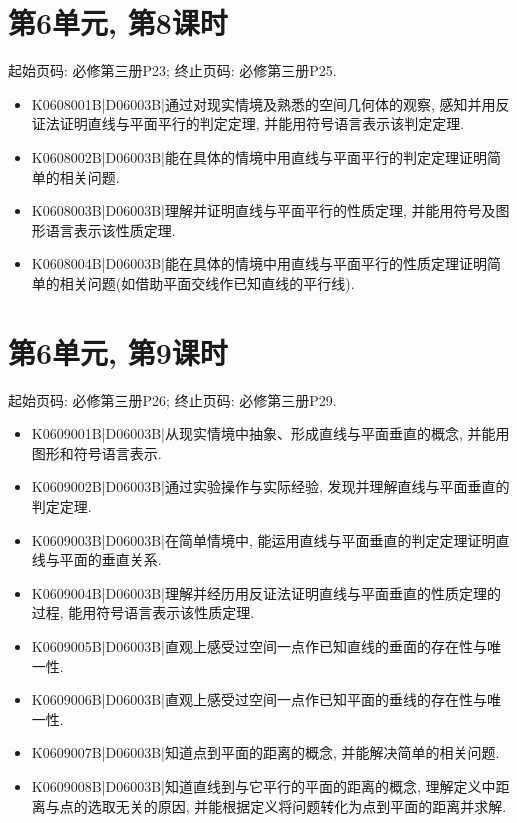 \section*{第6单元, 第8课时}
起始页码: 必修第三册P23; 终止页码: 必修第三册P25.
\begin{itemize}
\item K0608001B|D06003B|通过对现实情境及熟悉的空间几何体的观察, 感知并用反证法证明直线与平面平行的判定定理, 并能用符号语言表示该判定定理.
\item K0608002B|D06003B|能在具体的情境中用直线与平面平行的判定定理证明简单的相关问题.
\item K0608003B|D06003B|理解并证明直线与平面平行的性质定理, 并能用符号及图形语言表示该性质定理.
\item K0608004B|D06003B|能在具体的情境中用直线与平面平行的性质定理证明简单的相关问题(如借助平面交线作已知直线的平行线).
\end{itemize}

\section*{第6单元, 第9课时}
起始页码: 必修第三册P26; 终止页码: 必修第三册P29.
\begin{itemize}
\item K0609001B|D06003B|从现实情境中抽象、形成直线与平面垂直的概念, 并能用图形和符号语言表示.
\item K0609002B|D06003B|通过实验操作与实际经验, 发现并理解直线与平面垂直的判定定理.
\item K0609003B|D06003B|在简单情境中, 能运用直线与平面垂直的判定定理证明直线与平面的垂直关系.
\item K0609004B|D06003B|理解并经历用反证法证明直线与平面垂直的性质定理的过程, 能用符号语言表示该性质定理.
\item K0609005B|D06003B|直观上感受过空间一点作已知直线的垂面的存在性与唯一性.
\item K0609006B|D06003B|直观上感受过空间一点作已知平面的垂线的存在性与唯一性.
\item K0609007B|D06003B|知道点到平面的距离的概念, 并能解决简单的相关问题.
\item K0609008B|D06003B|知道直线到与它平行的平面的距离的概念, 理解定义中距离与点的选取无关的原因, 并能根据定义将问题转化为点到平面的距离并求解.
\end{itemize}

